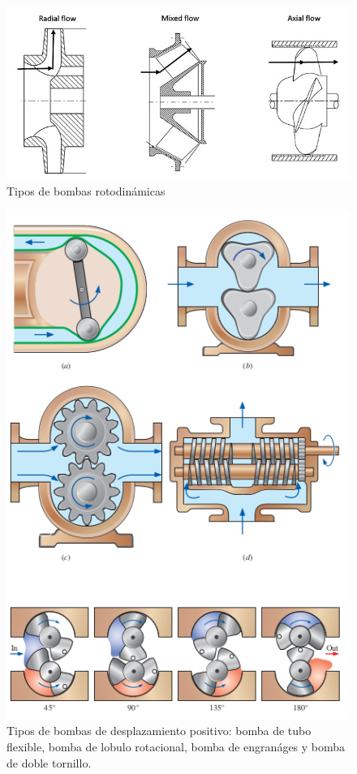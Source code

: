 \documentclass[11pt, oneside]{article}
\begin{document}
\begin{figure}[h]
\centering
\includegraphics[width=12cm]{./figs/bom0.jpg}
\caption{Tipos de bombas rotodin\'amicas} 
\label{bom0}
\end{figure}

\begin{figure}[h]
\centering
\includegraphics[width=12cm]{./figs/bom0a.png}
\caption{Tipos de bombas de desplazamiento positivo: bomba de tubo flexible, bomba de lobulo rotacional, bomba de engran\'ages y bomba de doble tornillo. } 
\label{bom0a}
\end{figure}
\end{document}
